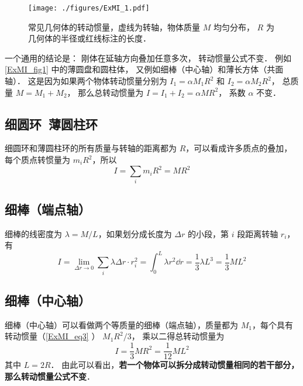 

\begin{figure}[ht]
\centering
\texttt{[image: ./figures/ExMI\_1.pdf]}
\caption{常见几何体的转动惯量，虚线为转轴，物体质量 $M$ 均匀分布， $R$ 为几何体的半径或红线标注的长度．}\label{ExMI_fig1}
\end{figure}

一个通用的结论是： 刚体在延轴方向叠加任意多次， 转动惯量公式不变． 例如\autoref{ExMI_fig1} 中的薄圆盘和圆柱体， 又例如细棒（中心轴）和薄长方体（共面轴）． 这是因为如果两个物体转动惯量分别为 $I_1 = \alpha M_1 R^2$ 和 $I_2 = \alpha M_2 R^2$， 总质量 $M = M_1 + M_2$， 那么总转动惯量为 $I = I_1 + I_2 = \alpha M R^2$， 系数 $\alpha$ 不变．

\subsection{细圆环\ 薄圆柱环}
细圆环和薄圆柱环的所有质量与转轴的距离都为 $R$，可以看成许多质点的叠加，每个质点转惯量为 $m_i R^2$，所以
\begin{equation}\label{ExMI_eq4}
I = \sum_i m_i R^2 = M R^2
\end{equation}

\subsection{ 细棒（端点轴）}
细棒的线密度为 $\lambda  = M/L$，如果划分成长度为 $\Delta r$ 的小段，第 $i$ 段距离转轴 $r_i$， 有
\begin{equation}\label{ExMI_eq3}
I = \lim_{\Delta r \to 0}\sum_i \lambda\Delta r \cdot r_i^2 =  \int_0^L \lambda r^2 \dd{r} = \frac{1}{3}\lambda L^3 = \frac{1}{3}M L^2
\end{equation}

\subsection{细棒（中心轴）}
细棒（中心轴）可以看做两个等质量的细棒（端点轴），质量都为 $M_1$，每个具有转动惯量（\autoref{ExMI_eq3} ） $M_1 R^2/3$， 乘以二得总转动惯量为
\begin{equation}\label{ExMI_eq2}
I = \frac{1}{3} MR^2 = \frac{1}{12}ML^2
\end{equation}
其中 $L=2R$． 由此可以看出，\textbf{若一个物体可以拆分成转动惯量相同的若干部分，那么转动惯量公式不变}．


